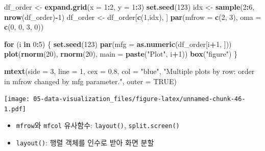 \documentclass[
  11pt,
]{krantz}
\newenvironment{Shaded}{\begin{snugshade}}{\end{snugshade}}
\newcommand{\ControlFlowTok}[1]{\textcolor[rgb]{0.27,0.27,0.27}{\textbf{#1}}}
\newcommand{\DataTypeTok}[1]{\textcolor[rgb]{0.27,0.27,0.27}{#1}}
\newcommand{\DecValTok}[1]{\textcolor[rgb]{0.06,0.06,0.06}{#1}}
\newcommand{\FloatTok}[1]{\textcolor[rgb]{0.06,0.06,0.06}{#1}}
\newcommand{\KeywordTok}[1]{\textcolor[rgb]{0.27,0.27,0.27}{\textbf{#1}}}
\newcommand{\NormalTok}[1]{#1}
\newcommand{\OperatorTok}[1]{\textcolor[rgb]{0.43,0.43,0.43}{\textbf{#1}}}
\newcommand{\OtherTok}[1]{\textcolor[rgb]{0.37,0.37,0.37}{#1}}
\newcommand{\StringTok}[1]{\textcolor[rgb]{0.5,0.5,0.5}{#1}}
\begin{document}
\begin{Shaded}
\begin{Highlighting}[]
\NormalTok{df_order <-}\StringTok{ }\KeywordTok{expand.grid}\NormalTok{(}\DataTypeTok{x =} \DecValTok{1}\OperatorTok{:}\DecValTok{2}\NormalTok{,}
                        \DataTypeTok{y =} \DecValTok{1}\OperatorTok{:}\DecValTok{3}\NormalTok{)}
\KeywordTok{set.seed}\NormalTok{(}\DecValTok{123}\NormalTok{)}
\NormalTok{idx <-}\StringTok{ }\KeywordTok{sample}\NormalTok{(}\DecValTok{2}\OperatorTok{:}\DecValTok{6}\NormalTok{, }\KeywordTok{nrow}\NormalTok{(df_order)}\OperatorTok{-}\DecValTok{1}\NormalTok{)}
\NormalTok{df_order <-}\StringTok{ }\NormalTok{df_order[}\KeywordTok{c}\NormalTok{(}\DecValTok{1}\NormalTok{,idx), ]}
\KeywordTok{par}\NormalTok{(}\DataTypeTok{mfrow =} \KeywordTok{c}\NormalTok{(}\DecValTok{2}\NormalTok{, }\DecValTok{3}\NormalTok{),}
    \DataTypeTok{oma =} \KeywordTok{c}\NormalTok{(}\DecValTok{0}\NormalTok{, }\DecValTok{0}\NormalTok{, }\DecValTok{3}\NormalTok{, }\DecValTok{0}\NormalTok{))}

\ControlFlowTok{for}\NormalTok{ (i }\ControlFlowTok{in} \DecValTok{0}\OperatorTok{:}\DecValTok{5}\NormalTok{) \{}
  \KeywordTok{set.seed}\NormalTok{(}\DecValTok{123}\NormalTok{)}
  \KeywordTok{par}\NormalTok{(}\DataTypeTok{mfg =} \KeywordTok{as.numeric}\NormalTok{(df_order[i}\OperatorTok{+}\DecValTok{1}\NormalTok{, ]))}
  \KeywordTok{plot}\NormalTok{(}\KeywordTok{rnorm}\NormalTok{(}\DecValTok{20}\NormalTok{), }\KeywordTok{rnorm}\NormalTok{(}\DecValTok{20}\NormalTok{),}
       \DataTypeTok{main =} \KeywordTok{paste}\NormalTok{(}\StringTok{"Plot"}\NormalTok{, i}\OperatorTok{+}\DecValTok{1}\NormalTok{))}
  \KeywordTok{box}\NormalTok{(}\StringTok{"figure"}\NormalTok{)}
\NormalTok{\}}

\KeywordTok{mtext}\NormalTok{(}\DataTypeTok{side =} \DecValTok{3}\NormalTok{, }\DataTypeTok{line =} \DecValTok{1}\NormalTok{, }\DataTypeTok{cex =} \FloatTok{0.8}\NormalTok{, }\DataTypeTok{col =} \StringTok{"blue"}\NormalTok{,}
    \StringTok{"Multiple plots by row: order in mfrow changed by mfg parameter."}\NormalTok{,}
    \DataTypeTok{outer =} \OtherTok{TRUE}\NormalTok{)}
\end{Highlighting}
\end{Shaded}

\texttt{[image: 05-data-visualization\_files/figure-latex/unnamed-chunk-46-1.pdf]}

\normalsize

\begin{itemize}
\item
  \texttt{mfrow}와 \texttt{mfcol} 유사함수: \texttt{layout()}, \texttt{split.screen()}
\item
  \texttt{layout()}: 행렬 객체를 인수로 받아 화면 분할
\end{itemize}
\end{document}

